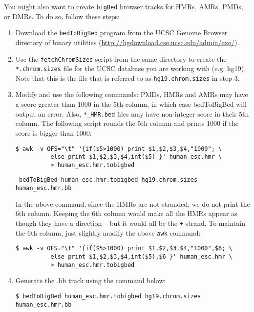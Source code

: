 \documentclass[10pt]{article}
\newcommand{\prog}[1]{\texttt{#1}}
\newcommand{\fn}[1]{\texttt{#1}}
\newcommand{\lit}[1]{\texttt{#1}}
\begin{document}
{{\noindent
You might also want to create \fn{bigBed} browser tracks for HMRs,
AMRs, PMDs, or DMRs. To do so, follow these steps:
\begin{enumerate}
\item Download the \prog{bedToBigBed} program from the UCSC Genome
  Browser directory of binary utilities
  (\url{http://hgdownload.cse.ucsc.edu/admin/exe/}).
\item Use the \fn{fetchChromSizes} script from the same directory to
  create the \fn{*.chrom.sizes} file for the UCSC database you are
  working with (e.g. hg19). Note that this is the file that is
  referred to as \fn{hg19.chrom.sizes} in step 3.
\item Modify and use the following commands: PMDs, HMRs and AMRs may
  have a score greater than 1000 in the 5th column, in which case
  bedToBigBed will output an error. Also, \fn{*\_HMR.bed} files
  may have non-integer score in their 5th column. The following script
  rounds the 5th column and prints 1000 if the score is bigger than 1000:
\begin{verbatim}
$ awk -v OFS="\t" '{if($5>1000) print $1,$2,$3,$4,"1000"; \
          else print $1,$2,$3,$4,int($5) }' human_esc.hmr \
          > human_esc.hmr.tobigbed
\end{verbatim}

\begin{verbatim}
 bedToBigBed human_esc.hmr.tobigbed hg19.chrom.sizes human_esc.hmr.bb
\end{verbatim}

  In the above command, since the HMRs are not stranded, we do not
  print the 6th column. Keeping the 6th column would make all the HMRs
  appear as though they have a direction -- but it would all be the
  \lit{+} strand. To maintain the 6th column, just slightly modify the
  above \prog{awk} command:

\begin{verbatim}
$ awk -v OFS="\t" '{if($5>1000) print $1,$2,$3,$4,"1000",$6; \
          else print $1,$2,$3,$4,int($5),$6 }' human_esc.hmr \
          > human_esc.hmr.tobigbed
\end{verbatim}

\item Generate the .bb track using the command below:

\begin{verbatim}
$ bedToBigBed human_esc.hmr.tobigbed hg19.chrom.sizes human_esc.hmr.bb
\end{verbatim} 
\end{enumerate}

}}
\end{document}

